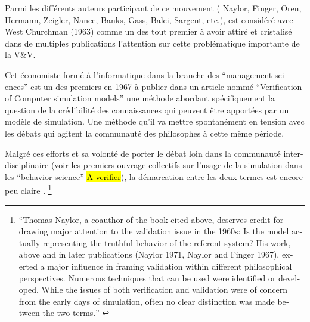 
Parmi les différents auteurs participant de ce mouvement ( Naylor, Finger, Oren, Hermann, Zeigler, Nance, Banks, Gass, Balci, Sargent, etc.), \textcite{Naylor1966} est considéré avec West Churchman (1963) comme un des tout premier à avoir attiré et cristalisé  dans de multiples publications l'attention sur cette problématique importante de la V\&V.

Cet économiste formé à l'informatique dans la branche des \foreignquote{english}{management sciences} \autocite{Stricklin1985} est un des premiers en 1967 \autocite{Naylor1967} à publier dans un article nommé \foreignquote{english}{Verification of Computer simulation models} une méthode abordant spécifiquement la question de la crédibilité des connaissances qui peuvent être apportées par un modèle de simulation. Une méthode qu'il va mettre spontanément en tension avec les débats qui agitent la communauté des philosophes à cette même période.

Malgré ces efforts et sa volonté de porter le débat loin dans la communauté inter-disciplinaire (voir les premiers ouvrage collectifs sur l'usage de la simulation dans les \enquote{behavior science} \autocite{Dutton1971, Guetzkow1972} \hl{A verifier}), la démarcation entre les deux termes est encore peu claire \autocites[165]{Nance2002}[3]{Balci1986}. \footnote{\foreignquote{english}{Thomas Naylor, a coauthor of the book cited above, deserves credit for drawing major attention to the validation issue in the 1960s: Is the model actually representing the truthful behavior of the referent system? His work, above and in later publications (Naylor 1971, Naylor and Finger 1967), exerted a major influence in framing validation within different philosophical perspectives. Numerous techniques that can be used were identified or developed. While the issues of both verification and validation were of concern from the early days of simulation, often no clear distinction was made between the two terms.} \autocite[165]{Nance2002}}


